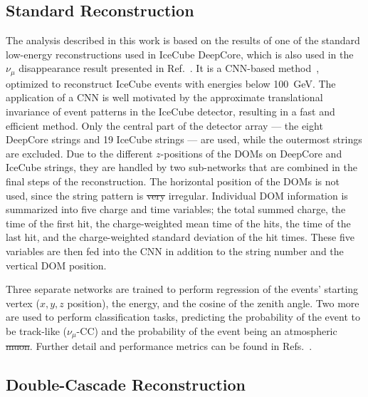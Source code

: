 \documentclass[
    aps,
    prd,
    reprint,
    amsmath,
    amssymb,
    nofootinbib,
    linenumbers,
    superscriptaddress,
    floatfix
]{revtex4-2}
\newcommand{\gev}{\giga\electronvolt}
\providecommand{\DIFaddtex}[1]{{\protect\color{blue}\uwave{#1}}} %
\providecommand{\DIFdeltex}[1]{{\protect\color{red}\sout{#1}}}                      %
\providecommand{\DIFaddbegin}{} %
\providecommand{\DIFaddend}{} %
\providecommand{\DIFdelbegin}{} %
\providecommand{\DIFdelend}{} %
\providecommand{\DIFadd}[1]{\texorpdfstring{\DIFaddtex{#1}}{#1}} %
\providecommand{\DIFdel}[1]{\texorpdfstring{\DIFdeltex{#1}}{}} %
\newcommand{\DIFscaledelfig}{0.5}
\newlength{\DIFdelgraphicswidth} %
\newlength{\DIFdelgraphicsheight} %
\newcommand{\DIFaddincludegraphics}[2][]{{\color{blue}\fbox{\DIFOincludegraphics[#1]{#2}}}} %
\newcommand{\DIFdelincludegraphics}[2][]{%
\sbox{\DIFdelgraphicsbox}{\DIFOincludegraphics[#1]{#2}}%
\settoboxwidth{\DIFdelgraphicswidth}{\DIFdelgraphicsbox} %
\settoboxtotalheight{\DIFdelgraphicsheight}{\DIFdelgraphicsbox} %
\scalebox{\DIFscaledelfig}{%
\parbox[b]{\DIFdelgraphicswidth}{\usebox{\DIFdelgraphicsbox}\\[-\baselineskip] \rule{\DIFdelgraphicswidth}{0em}}\llap{\resizebox{\DIFdelgraphicswidth}{\DIFdelgraphicsheight}{%
\setlength{\unitlength}{\DIFdelgraphicswidth}%
\begin{picture}(1,1)%
\thicklines\linethickness{2pt} %
{\color[rgb]{1,0,0}\put(0,0){\framebox(1,1){}}}%
{\color[rgb]{1,0,0}\put(0,0){\line( 1,1){1}}}%
{\color[rgb]{1,0,0}\put(0,1){\line(1,-1){1}}}%
\end{picture}%
}\hspace*{3pt}}} %
} %
\DeclareRobustCommand{\DIFaddbegin}{\DIFOaddbegin \let\includegraphics\DIFaddincludegraphics} %
\DeclareRobustCommand{\DIFaddend}{\DIFOaddend \let\includegraphics\DIFOincludegraphics} %
\DeclareRobustCommand{\DIFdelbegin}{\DIFOdelbegin \let\includegraphics\DIFdelincludegraphics} %
\DeclareRobustCommand{\DIFdelend}{\DIFOaddend \let\includegraphics\DIFOincludegraphics} %
\begin{document}
\subsection{\label{sec:flercnn} Standard Reconstruction}

The analysis described in this work is based on the results of one of the standard low-energy reconstructions used in IceCube DeepCore, which is also used in the $\nu_{\mu}$ disappearance result presented in Ref.~\cite{IceCube:2024xjj}.
It is a CNN-based method~\cite{Micallef:2022jvd, flercnn_proceedings, flercnn}, optimized to reconstruct IceCube events with energies below \SI{100}{\gev}.
The application of a CNN is well motivated by the approximate translational invariance of event patterns in the IceCube detector, resulting in a fast and efficient method.
Only the central part of the detector array --- the eight DeepCore strings and 19 IceCube strings --- are used, while the outermost strings are excluded.
Due to the different $z$-positions of the DOMs on DeepCore and IceCube strings, they are handled by two sub-networks that are combined in the final steps of the reconstruction.
The horizontal position of the DOMs is not used, since the string pattern is \DIFdelbegin \DIFdel{very }\DIFdelend irregular.
Individual DOM information is summarized into five charge and time variables; the total summed charge, the time of the first hit, the charge-weighted mean time of the hits, the time of the last hit, and the charge-weighted standard deviation of the hit times. These five variables are then fed into the CNN in addition to the string number and the vertical DOM position.

Three separate networks are trained to perform regression of the events' starting vertex ($x,y,z$ position), the energy, and the cosine of the zenith angle.
Two more are used to perform classification tasks, predicting the probability of the event to be track-like ($\nu_\mu$-CC) and the probability of the event being an atmospheric \DIFdelbegin \DIFdel{muon}\DIFdelend \DIFaddbegin \DIFadd{$\mu$}\DIFaddend . Further detail and performance metrics can be found in Refs.~\cite{Micallef:2022jvd, flercnn_proceedings}.


\subsection{\label{sec:taupede} Double-Cascade Reconstruction}
\end{document}
